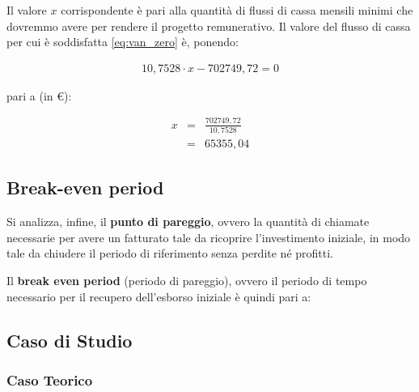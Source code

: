 Il valore $x$ corrispondente è pari alla quantità di flussi di cassa mensili minimi che dovremmo avere per rendere il progetto remunerativo. Il valore del flusso di cassa per cui è soddisfatta \ref{eq:van_zero} è, ponendo:
			
	\begin{equation}
	\label{eq:van_pareggio_1}
	\begin{split}
 		10,7528 \cdot x - 702749,72 = 0	
 	\end{split}
	\end{equation}			

pari a (in \euro):
			
	\begin{eqnarray}
	\label{eq:van_pareggio_2}
		x & = & \frac{702749,72	}{10,7528}	 	\nonumber \\[1.5ex] 
		  & = & 65355,04
	\end{eqnarray}

\subsection[Break-even period]{Break-even period}
	Si analizza, infine, il \textbf{punto di pareggio}, ovvero la quantità di chiamate necessarie per avere un fatturato tale da ricoprire l'investimento iniziale, in modo tale da chiudere il periodo di riferimento senza perdite né profitti.

Il \textbf{break even period} (periodo di pareggio), ovvero il periodo di tempo necessario per il recupero dell'esborso iniziale è quindi pari a:   	

\subsection[Caso di Studio]{Caso di Studio}


\subsubsection[Caso Teorico]{Caso Teorico}

